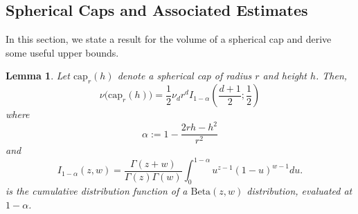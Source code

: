 \documentclass[11pt,twoside]{article}
\newtheorem{lemma}{Lemma}
\newcommand{\1}{\mathbf{1}}
\begin{document}
\subsection{Spherical Caps and Associated Estimates}
\label{sec:caps}
In this section, we state a result for the volume of a spherical cap and derive some 
useful upper bounds. 
\begin{lemma}
	\label{lem: volume_of_spherical_cap}
	Let $\mathrm{cap}_r(h)$ denote a spherical cap of radius $r$ and height $h$. Then, 
	\begin{equation*}
	\nu\bigl( \mathrm{cap}_r(h)  \bigr) = \frac{1}{2} \nu_d r^d I_{1 - \alpha}\left(\frac{d + 1}{2}; \frac{1}{2}\right)
	\end{equation*}
	where
	\begin{equation*}
	\alpha := 1 - \frac{2 r h - h^2}{r^2}
	\end{equation*}
	and
	\begin{equation*}
	I_{1 - \alpha}(z,w) = \frac{\Gamma(z + w)}{\Gamma(z) \Gamma(w)} \int_{0}^{1 - \alpha} u^{z - 1} (1 - u)^{w - 1} du.
	\end{equation*}
	is the cumulative distribution function of a $\mathrm{Beta}(z,w)$ distribution, evaluated at $1 - \alpha$. 
\end{lemma}
\end{document}

